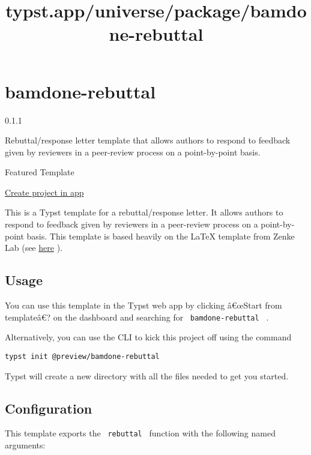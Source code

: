 \title{typst.app/universe/package/bamdone-rebuttal}

\label{banner}
\label{template-thumbnail}

\section{bamdone-rebuttal}\label{bamdone-rebuttal}

{ 0.1.1 }

Rebuttal/response letter template that allows authors to respond to
feedback given by reviewers in a peer-review process on a point-by-point
basis.

{ } Featured Template

\href{/app?template=bamdone-rebuttal&version=0.1.1}{Create project in
app}

\label{readme}
This is a Typst template for a rebuttal/response letter. It allows
authors to respond to feedback given by reviewers in a peer-review
process on a point-by-point basis. This template is based heavily on the
LaTeX template from Zenke Lab (see
\href{https://zenkelab.org/resources/latex-rebuttal-response-to-reviewers-template/}{here}
).

\subsection{Usage}\label{usage}

You can use this template in the Typst web app by clicking â€œStart from
templateâ€? on the dashboard and searching for
\texttt{\ bamdone-rebuttal\ } .

Alternatively, you can use the CLI to kick this project off using the
command

\begin{verbatim}
typst init @preview/bamdone-rebuttal
\end{verbatim}

Typst will create a new directory with all the files needed to get you
started.

\subsection{Configuration}\label{configuration}

This template exports the \texttt{\ rebuttal\ } function with the
following named arguments:

